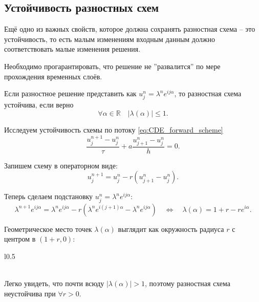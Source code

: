 \documentclass{article}
\begin{document}
\subsection{Устойчивость разностных схем}
Ещё одно из важных свойств, которое должна сохранять разностная схема -- это
устойчивость, то есть малым изменениям входным данным должно соответствовать
малые изменения решения.

Необходимо прогарантировать, что решение не ''развалится'' по мере прохождения
временных слоёв.

\begin{theorem}
	Если разностное решение представить как $u_j^n=\lambda^ne^{ij\alpha}$,
	то разностная схема устойчива, если верно
	\[\forall\alpha\in\mathbb R\quad|\lambda(\alpha)|\le 1.\]
\end{theorem}

\begin{example}
	Исследуем устойчивость схемы по потоку \eqref{eq:CDE_forward_scheme}
	\[\frac{u_j^{n+1}-u_j^n}{\tau}+a\frac{u_{j+1}^n-u_j^n}{h}=0.\]

	Запишем схему в операторном виде:
	\[u_j^{n+1}=u_j^n-r(u_{j+1}^n-u_j^n).\]

	Теперь сделаем подстановку $u_j^n=\lambda^ne^{ij\alpha}$:
	\[\lambda^{n+1}e^{ij\alpha}=\lambda^ne^{ij\alpha}-r(\lambda^n
	e^{i(j+1)\alpha}-\lambda^ne^{ij\alpha})\quad\Leftrightarrow\quad
	\lambda(\alpha)=1+r-re^{i\alpha}.\]

	Геометрическое место точек $\lambda(\alpha)$ выглядит как окружность
	радиуса $r$ с центром в $(1+r,0)$:

	{\makeatletter
	\let\par\@@par
	\par{}
	\everypar{}

	\begin{wrapfigure}{l}{0.5\textwidth}
		
	\end{wrapfigure}

	\leavevmode\\
	Легко увидеть, что почти всюду $|\lambda(\alpha)|>1$, поэтому
	разностная схема неустойчива при $\forall r>0$.
	\par}
\end{example}\leavevmode
\\
\end{document}
